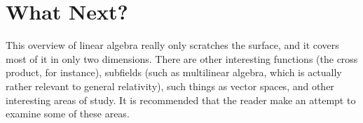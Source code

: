 \section{What Next?}
This overview of linear algebra really only scratches the surface, and it covers most of it in only two dimensions. There are other interesting functions (the cross product, for instance), subfields (such as multilinear algebra, which is actually rather relevant to general relativity), such things as vector spaces, and other interesting areas of study. It is recommended that the reader make an attempt to examine some of these areas.
